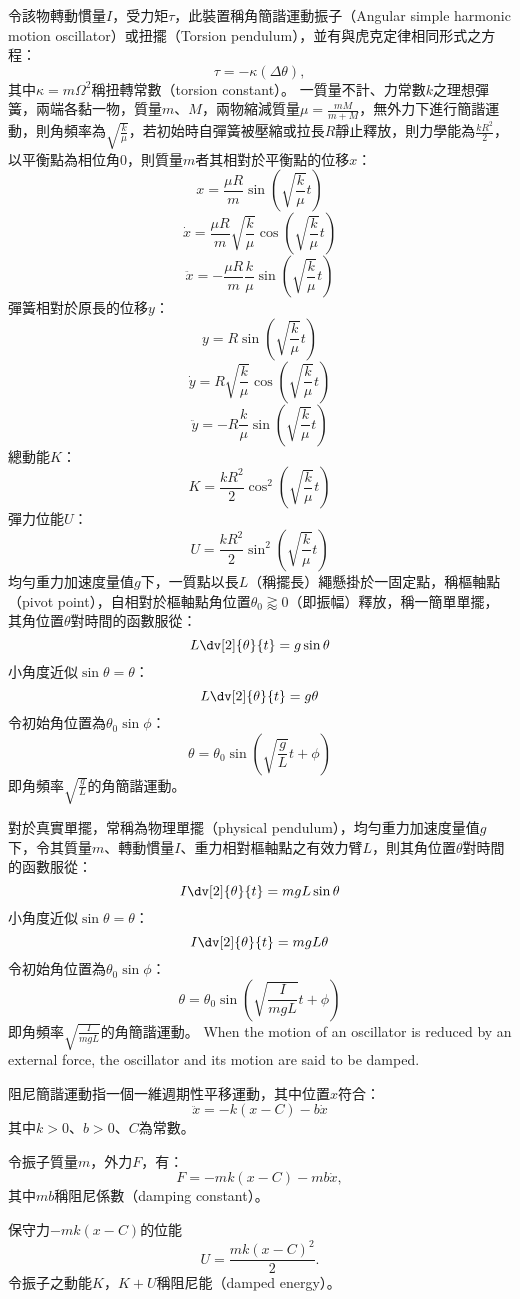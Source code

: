 \documentclass[a4paper,12pt]{article}
\begin{document}
令該物轉動慣量$I$，受力矩$\tau$，此裝置稱角簡諧運動振子（Angular simple harmonic motion oscillator）或扭擺（Torsion pendulum），並有與虎克定律相同形式之方程：
\[\tau=-\kappa(\Delta \theta),\]
其中$\kappa=m\Omega^2$稱扭轉常數（torsion constant）。
一質量不計、力常數$k$之理想彈簧，兩端各黏一物，質量$m$、$M$，兩物縮減質量$\mu=\frac{mM}{m+M}$，無外力下進行簡諧運動，則角頻率為$\sqrt{\frac{k}{\mu}}$，若初始時自彈簧被壓縮或拉長$R$靜止釋放，則力學能為$\frac{kR^2}{2}$，以平衡點為相位角$0$，則質量$m$者其相對於平衡點的位移$x$：
\[x=\frac{\mu R}{m}\sin(\sqrt{\frac{k}{\mu}}t)\]
\[\dot{x}=\frac{\mu R}{m}\sqrt{\frac{k}{\mu}}\cos(\sqrt{\frac{k}{\mu}}t)\]
\[\ddot{x}=-\frac{\mu R}{m}\frac{k}{\mu}\sin(\sqrt{\frac{k}{\mu}}t)\]
彈簧相對於原長的位移$y$：
\[y=R\sin(\sqrt{\frac{k}{\mu}}t)\]
\[\dot{y}=R\sqrt{\frac{k}{\mu}}\cos(\sqrt{\frac{k}{\mu}}t)\]
\[\ddot{y}=-R\frac{k}{\mu}\sin(\sqrt{\frac{k}{\mu}}t)\]
總動能$K$：
\[K=\frac{kR^2}{2}\cos^2(\sqrt{\frac{k}{\mu}}t)\]
彈力位能$U$：
\[U=\frac{kR^2}{2}\sin^2(\sqrt{\frac{k}{\mu}}t)\]
均勻重力加速度量值$g$下，一質點以長$L$（稱擺長）繩懸掛於一固定點，稱樞軸點（pivot point），自相對於樞軸點角位置$\theta_0\gtrapprox 0$（即振幅）釋放，稱一簡單單擺，其角位置$\theta$對時間的函數服從：
\[L\dv[2]{\theta}{t}=g\sin\theta\]
小角度近似$\sin\theta=\theta$：
\[L\dv[2]{\theta}{t}=g\theta\]
令初始角位置為$\theta_0\sin\phi$：
\[\theta=\theta_0\sin(\sqrt{\frac{g}{L}} t+\phi)\]
即角頻率$\sqrt{\frac{g}{L}}$的角簡諧運動。

對於真實單擺，常稱為物理單擺（physical pendulum），均勻重力加速度量值$g$下，令其質量$m$、轉動慣量$I$、重力相對樞軸點之有效力臂$L$，則其角位置$\theta$對時間的函數服從：
\[I\dv[2]{\theta}{t}=mgL\sin\theta\]
小角度近似$\sin\theta=\theta$：
\[I\dv[2]{\theta}{t}=mgL\theta\]
令初始角位置為$\theta_0\sin\phi$：
\[\theta=\theta_0\sin(\sqrt{\frac{I}{mgL}} t+\phi)\]
即角頻率$\sqrt{\frac{I}{mgL}}$的角簡諧運動。
When the motion of an oscillator is reduced by an external force, the oscillator and its motion are said to be damped.

阻尼簡諧運動指一個一維週期性平移運動，其中位置$x$符合：
\[\ddot{x}=-k(x-C)-b\dot{x}\]
其中$k>0$、$b>0$、$C$為常數。

令振子質量$m$，外力$F$，有：
\[F=-mk(x-C)-mb\dot{x},\]
其中$mb$稱阻尼係數（damping constant）。

保守力$-mk(x-C)$的位能
\[U=\frac{mk(x-C)^2}{2}.\]
令振子之動能$K$，$K+U$稱阻尼能（damped energy）。
\end{document}
